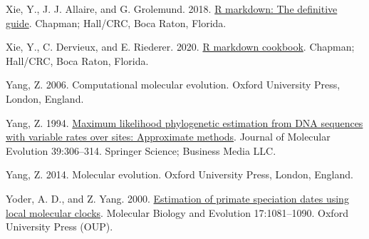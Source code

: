 \documentclass[fleqn,10pt,lineno]{wlpeerj} %
\newlength{\cslhangindent}
\newenvironment{CSLReferences}[2] %
 {\begin{list}{}{%
  \setlength{\itemindent}{0pt}
  \setlength{\leftmargin}{0pt}
  \setlength{\parsep}{0pt}
  \ifodd #1
   \setlength{\leftmargin}{\cslhangindent}
   \setlength{\itemindent}{-1\cslhangindent}
  \fi
  \setlength{\itemsep}{#2\baselineskip}}}
 {\end{list}}
\begin{document}
\begin{CSLReferences}{1}{0}
Xie, Y., J. J. Allaire, and G. Grolemund. 2018. \href{https://bookdown.org/yihui/rmarkdown}{R markdown: The definitive guide}. Chapman; Hall/CRC, Boca Raton, Florida.

Xie, Y., C. Dervieux, and E. Riederer. 2020. \href{https://bookdown.org/yihui/rmarkdown-cookbook}{R markdown cookbook}. Chapman; Hall/CRC, Boca Raton, Florida.

Yang, Z. 2006. Computational molecular evolution. Oxford University Press, London, England.

Yang, Z. 1994. \href{https://doi.org/10.1007/bf00160154}{Maximum likelihood phylogenetic estimation from DNA sequences with variable rates over sites: Approximate methods}. Journal of Molecular Evolution 39:306--314. Springer Science; Business Media LLC.

Yang, Z. 2014. Molecular evolution. Oxford University Press, London, England.

Yoder, A. D., and Z. Yang. 2000. \href{https://doi.org/10.1093/oxfordjournals.molbev.a026389}{Estimation of primate speciation dates using local molecular clocks}. Molecular Biology and Evolution 17:1081--1090. Oxford University Press (OUP).

\end{CSLReferences}
\end{document}
